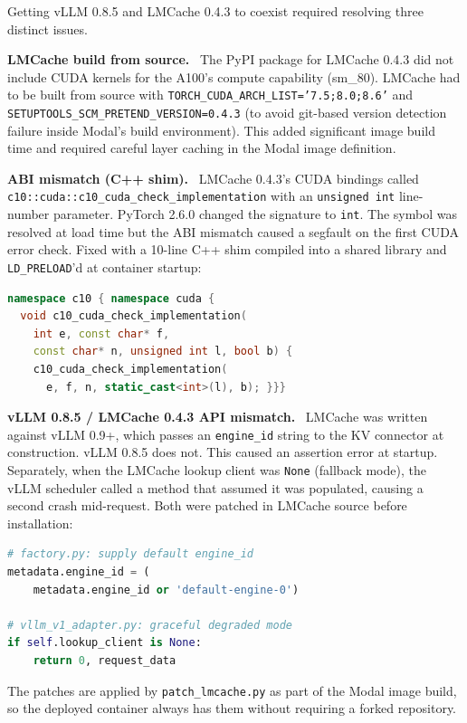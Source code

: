 \documentclass[letterpaper,twocolumn,10pt]{article}
\newcommand{\para}[1]{\smallskip\noindent\textbf{#1.}\ }
\begin{document}
Getting vLLM 0.8.5 and LMCache 0.4.3 to coexist required resolving three
distinct issues.

\para{LMCache build from source} The PyPI package for LMCache 0.4.3 did not
include CUDA kernels for the A100's compute capability (sm\_80). LMCache had
to be built from source with
\texttt{TORCH\_CUDA\_ARCH\_LIST='7.5;8.0;8.6'} and
\texttt{SETUPTOOLS\_SCM\_PRETEND\_VERSION=0.4.3} (to avoid git-based version
detection failure inside Modal's build environment). This added significant
image build time and required careful layer caching in the Modal image
definition.

\para{ABI mismatch (C++ shim)} LMCache 0.4.3's CUDA bindings called
\texttt{c10::cuda::c10\_cuda\_check\_implementation} with an \texttt{unsigned int}
line-number parameter. PyTorch 2.6.0 changed the signature to \texttt{int}.
The symbol was resolved at load time but the ABI mismatch caused a segfault
on the first CUDA error check. Fixed with a 10-line C++ shim compiled into a
shared library and \texttt{LD\_PRELOAD}'d at container startup:

\begin{lstlisting}[language=C++]
namespace c10 { namespace cuda {
  void c10_cuda_check_implementation(
    int e, const char* f,
    const char* n, unsigned int l, bool b) {
    c10_cuda_check_implementation(
      e, f, n, static_cast<int>(l), b); }}}
\end{lstlisting}

\para{vLLM 0.8.5 / LMCache 0.4.3 API mismatch} LMCache was written against
vLLM 0.9+, which passes an \texttt{engine\_id} string to the KV connector
at construction. vLLM 0.8.5 does not. This caused an assertion error at
startup. Separately, when the LMCache lookup client was \texttt{None}
(fallback mode), the vLLM scheduler called a method that assumed it was
populated, causing a second crash mid-request. Both were patched in LMCache
source before installation:

\begin{lstlisting}[language=Python]
# factory.py: supply default engine_id
metadata.engine_id = (
    metadata.engine_id or 'default-engine-0')

# vllm_v1_adapter.py: graceful degraded mode
if self.lookup_client is None:
    return 0, request_data
\end{lstlisting}

The patches are applied by \texttt{patch\_lmcache.py} as part of the Modal
image build, so the deployed container always has them without requiring a
forked repository.
\end{document}
